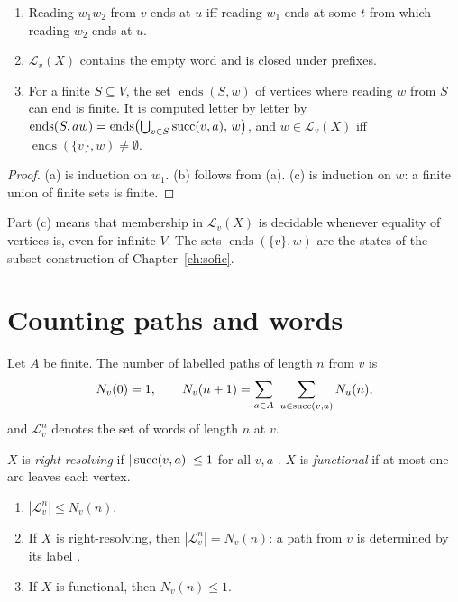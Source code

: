 \begin{proposition}\label{prop:words}
\begin{enumerate}[label=(\alph*)]
\item Reading \(w_1w_2\) from \(v\) ends at \(u\) iff reading \(w_1\) ends at some \(t\) from
  which reading \(w_2\) ends at \(u\).
\item \(\mathcal L_v(X)\) contains the empty word and is closed under prefixes.
\item For a finite \(S\subseteq V\), the set \(\operatorname{ends}(S,w)\) of vertices where reading
  \(w\) from \(S\) can end is finite. It is computed letter by letter by
  \(\operatorname{ends}(S,aw)=\operatorname{ends}\bigl(\bigcup_{v\in S}\operatorname{succ}(v,a),\,w\bigr)\),
  and \(w\in\mathcal L_v(X)\) iff \(\operatorname{ends}(\{v\},w)\neq\emptyset\).
\end{enumerate}
\end{proposition}

\begin{proof}
(a) is induction on \(w_1\). (b) follows from (a). (c) is induction on \(w\): a finite union of
finite sets is finite.
\end{proof}

Part (c) means that membership in \(\mathcal L_v(X)\) is decidable whenever equality of vertices
is, even for infinite \(V\). The sets \(\operatorname{ends}(\{v\},w)\) are the states of the
subset construction of Chapter~\ref{ch:sofic}.

\section{Counting paths and words}

Let \(A\) be finite. The number of labelled paths of length \(n\) from \(v\) is
\[
  N_v(0)=1,\qquad N_v(n+1)=\sum_{a\in A}\ \sum_{u\in\succc(v,a)}N_u(n),
\]
and \(\mathcal L_v^n\) denotes the set of words of length \(n\) at \(v\).

\begin{definition}
\(X\) is \emph{right-resolving} if \(|\operatorname{succ}(v,a)|\le1\) for all \(v,a\) \cite[Def.~3.3.1]{LM95}.
\(X\) is \emph{functional} if at most one arc leaves each vertex.
\end{definition}

\begin{proposition}\label{prop:count}
\begin{enumerate}[label=(\alph*)]
\item \(|\mathcal L_v^n|\le N_v(n)\).
\item If \(X\) is right-resolving, then \(|\mathcal L_v^n|=N_v(n)\): a path from \(v\) is
  determined by its label \cite[Prop.~3.3.9]{LM95}.
\item If \(X\) is functional, then \(N_v(n)\le1\).
\end{enumerate}
\end{proposition}

